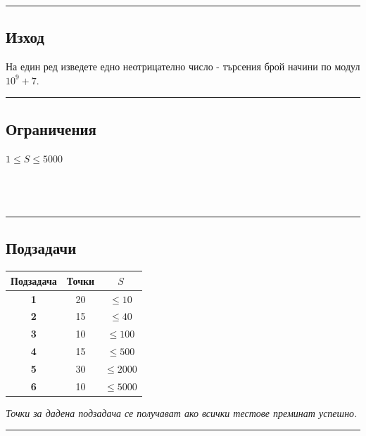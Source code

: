 \documentclass[12pt]{article}
\begin{document}
\noindent\textcolor{cyan}{\rule{8cm}{1.0mm}}
\subsection*{\hspace{0.61cm}Изход}
На един ред изведете едно неотрицателно число - търсения брой начини по модул $10^9+7$.

\noindent\textcolor{cyan}{\rule{8cm}{1.0mm}}
\subsection*{\hspace{0.61cm}Ограничения}
$1 \leq S \leq 5000$
\\ \\ \\ \\

\noindent\textcolor{cyan}{\rule{8cm}{1.0mm}}
\subsection*{\hspace{0.61cm}Подзадачи}
\begin{tabular}{ |c|c|c| }
\hline
\rule{0pt}{2.2ex} \textbf{Подзадача} & \textbf{Точки} & $S$\\ 
\hline
\rule{0pt}{2.2ex} \textbf{1} & 20 & $\leq 10$\\ 
\hline
\rule{0pt}{2.2ex} \textbf{2} & 15 & $\leq 40$\\ 
\hline
\rule{0pt}{2.2ex} \textbf{3} & 10 & $\leq 100$\\ 
\hline
\rule{0pt}{2.2ex} \textbf{4} & 15 & $\leq 500$\\  
\hline
\rule{0pt}{2.2ex} \textbf{5} & 30 & $\leq 2000$\\  
\hline
\rule{0pt}{2.2ex} \textbf{6} & 10 & $\leq 5000$\\  
\hline
\end{tabular}
\newline\newline
\indent \textit{Точки за дадена подзадача се получават ако всички тестове преминат успешно.}

\noindent\textcolor{cyan}{\rule{8cm}{1.0mm}}
\end{document}
